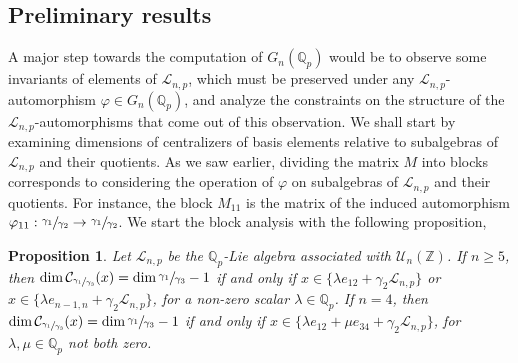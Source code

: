\documentclass[12pt]{article}
\newtheorem{proposition}[theorem]{Proposition}
\begin{document}
\subsection{Preliminary results}
\label{preliminary.results}
A major step towards the computation of $G_n(\mathbb{Q}_p)$ would be to observe some invariants of elements of $\mathcal{L}_{n,p}$, which must be preserved under any $\mathcal{L}_{n,p}$-automorphism $\varphi\in G_n(\mathbb{Q}_p)$, and analyze the constraints on the structure of the $\mathcal{L}_{n,p}$-automorphisms that come out of this observation. We shall start by examining dimensions of centralizers of basis elements relative to subalgebras of $\mathcal{L}_{n,p}$ and their quotients. As we saw earlier, dividing the matrix $M$ into blocks corresponds to considering the operation of $\varphi$ on subalgebras of $\mathcal{L}_{n,p}$ and their quotients. For instance, the block $M_{11}$ is the matrix of the induced automorphism $\varphi_{11}:\sfrac{\gamma_1}{\gamma_2}\rightarrow\sfrac{\gamma_1}{\gamma_2}$. We start the block analysis with the following proposition,
\begin{proposition}
\label{prop.n.geq.5.centralizer.codimension}
Let $\mathcal{L}_{n,p}$ be the $\mathbb{Q}_p$-Lie algebra associated with $\mathcal{U}_n(\mathbb{Z})$. If $n\geq 5$, then $\dim\mathcal{C}_{\sfrac{\gamma_1}{\gamma_3}}(x)=\dim\sfrac{\gamma_1}{\gamma_3}-1$ if and only if $x\in\{\lambda e_{12}+\gamma_2\mathcal{L}_{n,p}\}$ or $x\in\{\lambda e_{n-1,n}+\gamma_2\mathcal{L}_{n,p}\}$, for a non-zero scalar $\lambda\in\mathbb{Q}_p$. If $n=4$, then $\dim\mathcal{C}_{\sfrac{\gamma_1}{\gamma_3}}(x)=\dim\sfrac{\gamma_1}{\gamma_3}-1$ if and only if $x\in\{\lambda e_{12}+\mu e_{34}+\gamma_2\mathcal{L}_{n,p}\}$, for $\lambda,\mu\in\mathbb{Q}_p$ not both zero.
\end{proposition}
\end{document}
